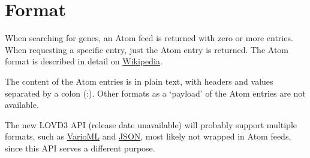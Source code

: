 \documentclass[a4paper,oneside,openany,12pt]{memoir}
\begin{document}
\section{Format}
When searching for genes, an Atom feed is returned with zero or more entries.
When requesting a specific entry, just the Atom entry is returned.
The Atom format is described in detail on \href{http://en.wikipedia.org/wiki/Atom_(standard)}{Wikipedia}.

The content of the Atom entries is in plain text, with headers and values separated by a colon (:).
Other formats as a `payload' of the Atom entries are not available.

The new LOVD3 API (release date unavailable) will probably support multiple formats, such as
 \href{http://www.varioml.org/}{VarioML} and \href{http://www.json.org/}{JSON},
 most likely not wrapped in Atom feeds, since this API serves a different purpose.



\clearpage
\end{document}
